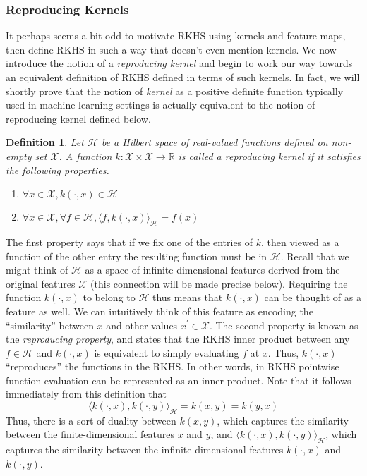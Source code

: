 \documentclass[12pt]{article}
\newcommand{\R}{\mathbb{R}}
\newtheorem{definition}{Definition}
\begin{document}
\subsubsection{Reproducing Kernels}
It perhaps seems a bit odd to motivate RKHS using kernels and feature maps, then define RKHS in such a way that doesn't even mention kernels. We now introduce the notion of a \textit{reproducing kernel} and begin to work our way towards an equivalent definition of RKHS defined in terms of such kernels. In fact, we will shortly prove that the notion of \textit{kernel} as a positive definite function typically used in machine learning settings is actually equivalent to the notion of reproducing kernel defined below. 
\begin{definition}
Let $\mathcal{H}$ be a Hilbert space of real-valued functions defined on non-empty set $\mathcal{X}$. A function $k: \mathcal{X} \times \mathcal{X} \to \R$ is called a reproducing kernel if it satisfies the following properties. 
\begin{enumerate}
\item $\forall x \in \mathcal{X}, k(\cdot, x) \in \mathcal{H}$
\item $\forall x \in \mathcal{X}, \forall f \in \mathcal{H}, \langle f, k(\cdot, x)\rangle_{\mathcal{H}} = f(x)$
\end{enumerate}
\end{definition} 
The first property says that if we fix one of the entries of $k$, then viewed as a function of the other entry the resulting function must be in $\mathcal{H}$. Recall that we might think of $\mathcal{H}$ as a space of infinite-dimensional features derived from the original features $\mathcal{X}$ (this connection will be made precise below). Requiring the function $k(\cdot, x)$ to belong to $\mathcal{H}$ thus means that $k(\cdot, x)$ can be thought of as a feature as well. We can intuitively think of this feature as encoding the ``similarity'' between $x$ and other values $x^\prime \in \mathcal{X}$. The second property is known as the \textit{reproducing property}, and states that the RKHS inner product between any $f \in \mathcal{H}$ and $k(\cdot, x)$ is equivalent to simply evaluating $f$ at $x$. Thus, $k(\cdot, x)$ ``reproduces'' the functions in the RKHS. In other words, in RKHS pointwise function evaluation can be represented as an inner product. Note that it follows immediately from this definition that 
\[\langle k(\cdot, x), k(\cdot, y) \rangle_{\mathcal{H}} = k(x, y) = k(y, x) \]
Thus, there is a sort of duality between $k(x, y)$, which captures the similarity between the finite-dimensional features $x$ and $y$, and 
$\langle k(\cdot, x), k(\cdot, y) \rangle_{\mathcal{H}}$, which captures the similarity between the infinite-dimensional features $k(\cdot, x)$ and $k(\cdot, y)$. 
\end{document}
